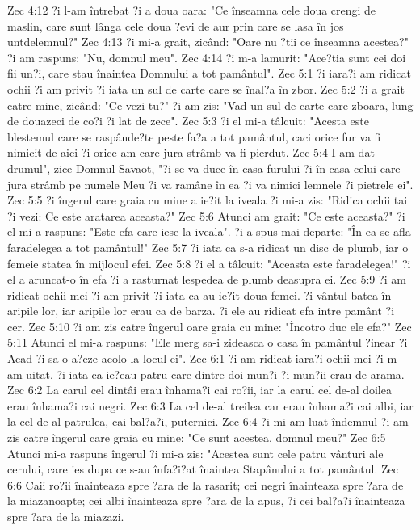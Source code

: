 Zec 4:12  ?i l-am întrebat ?i a doua oara: "Ce înseamna cele doua crengi de maslin, care sunt lânga cele doua ?evi de aur prin care se lasa în jos untdelemnul?"
Zec 4:13  ?i mi-a grait, zicând: "Oare nu ?tii ce înseamna acestea?" ?i am raspuns: "Nu, domnul meu".
Zec 4:14  ?i m-a lamurit: "Ace?tia sunt cei doi fii un?i, care stau înaintea Domnului a tot pamântul".
Zec 5:1  ?i iara?i am ridicat ochii ?i am privit ?i iata un sul de carte care se înal?a în zbor.
Zec 5:2  ?i a grait catre mine, zicând: "Ce vezi tu?" ?i am zis: "Vad un sul de carte care zboara, lung de douazeci de co?i ?i lat de zece".
Zec 5:3  ?i el mi-a tâlcuit: "Acesta este blestemul care se raspânde?te peste fa?a a tot pamântul, caci orice fur va fi nimicit de aici ?i orice am care jura strâmb va fi pierdut.
Zec 5:4  I-am dat drumul", zice Domnul Savaot, "?i se va duce în casa furului ?i în casa celui care jura strâmb pe numele Meu ?i va ramâne în ea ?i va nimici lemnele ?i pietrele ei".
Zec 5:5  ?i îngerul care graia cu mine a ie?it la iveala ?i mi-a zis: "Ridica ochii tai ?i vezi: Ce este aratarea aceasta?"
Zec 5:6  Atunci am grait: "Ce este aceasta?" ?i el mi-a raspuns: "Este efa care iese la iveala". ?i a spus mai departe: "În ea se afla faradelegea a tot pamântul!"
Zec 5:7  ?i iata ca s-a ridicat un disc de plumb, iar o femeie statea în mijlocul efei.
Zec 5:8  ?i el a tâlcuit: "Aceasta este faradelegea!" ?i el a aruncat-o în efa ?i a rasturnat lespedea de plumb deasupra ei.
Zec 5:9  ?i am ridicat ochii mei ?i am privit ?i iata ca au ie?it doua femei. ?i vântul batea în aripile lor, iar aripile lor erau ca de barza. ?i ele au ridicat efa intre pamânt ?i cer.
Zec 5:10  ?i am zis catre îngerul oare graia cu mine: "Încotro duc ele efa?"
Zec 5:11  Atunci el mi-a raspuns: "Ele merg sa-i zideasca o casa în pamântul ?inear ?i Acad ?i sa o a?eze acolo la locul ei".
Zec 6:1  ?i am ridicat iara?i ochii mei ?i m-am uitat. ?i iata ca ie?eau patru care dintre doi mun?i ?i mun?ii erau de arama.
Zec 6:2  La carul cel dintâi erau înhama?i cai ro?ii, iar la carul cel de-al doilea erau înhama?i cai negri.
Zec 6:3  La cel de-al treilea car erau înhama?i cai albi, iar la cel de-al patrulea, cai bal?a?i, puternici.
Zec 6:4  ?i mi-am luat îndemnul ?i am zis catre îngerul care graia cu mine: "Ce sunt acestea, domnul meu?"
Zec 6:5  Atunci mi-a raspuns îngerul ?i mi-a zis: "Acestea sunt cele patru vânturi ale cerului, care ies dupa ce s-au înfa?i?at înaintea Stapânului a tot pamântul.
Zec 6:6  Caii ro?ii înainteaza spre ?ara de la rasarit; cei negri înainteaza spre ?ara de la miazanoapte; cei albi înainteaza spre ?ara de la apus, ?i cei bal?a?i înainteaza spre ?ara de la miazazi.
